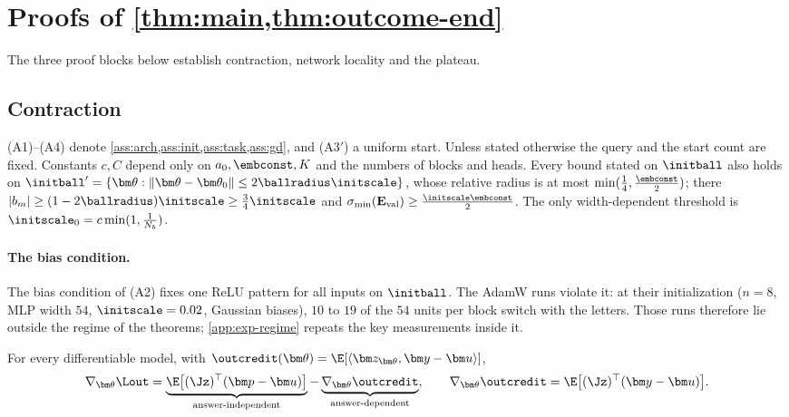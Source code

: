 \section{Proofs of \texorpdfstring{\cref{thm:main,thm:outcome-end}}{Lemma 1 and Theorem 1(ii)}}
\label{app:damping-proof}
\label{app:mainproofs}
\label{app:credit-proof}

The three proof blocks below establish contraction, network locality and the plateau.

\subsection{Contraction}
\label{app:C-fourier}
\label{app:assumptions}




(A1)--(A4) denote \cref{ass:arch,ass:init,ass:task,ass:gd}, and (A3$'$) a uniform start. Unless stated otherwise the query and the start
count are fixed. Constants $c,C$ depend only on $a_0,\embconst,K$ and the numbers of blocks and heads. Every bound stated on $\initball$ also
holds on $\initball'=\{\bm\theta:\|\bm\theta-\bm\theta_0\|\le2\ballradius\initscale\}$, whose relative radius is at most $\min(\frac{1}{4},\frac{\embconst}{2})$; there
$|b_m|\ge(1-2\ballradius)\initscale\ge\frac{3}{4}\initscale$ and $\sigma_{\min}(\mathbf E_{\mathrm{val}})\ge\frac{\initscale\embconst}{2}$. The only width-dependent threshold is $\initscale_0=c\min(1,\frac{1}{N_b})$.

\paragraph{The bias condition.}\label{rem:two-block-bias} The bias condition of (A2) fixes one ReLU pattern for all inputs on $\initball$. The AdamW runs violate it: at their initialization
($n=8$, MLP width $54$, $\initscale=0.02$, Gaussian biases), $10$ to $19$ of the $54$ units per block switch with the letters. Those
runs therefore lie outside the regime of the theorems; \cref{app:exp-regime} repeats the key measurements inside it.


\begin{lemma}
\label{lem:gradient-split}
For every differentiable model, with $\outcredit(\bm\theta)=\E[\langle\bm z_{\bm\theta},\bm y-\bm u\rangle]$,
\[
 \nabla_{\bm\theta}\Lout=\underbrace{\E\bigl[(\Jz)^\top(\bm p-\bm u)\bigr]}_{\text{answer-independent}}-\underbrace{\nabla_{\bm\theta}\outcredit}_{\text{answer-dependent}},\qquad
 \nabla_{\bm\theta}\outcredit=\E\bigl[(\Jz)^\top(\bm y-\bm u)\bigr].
\]
\end{lemma}

